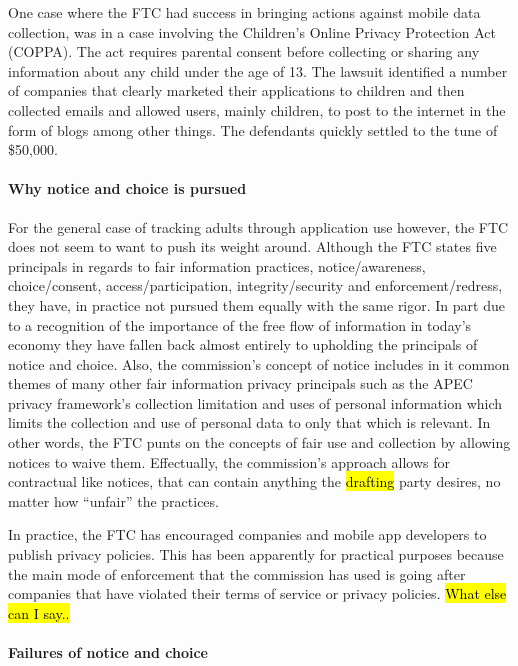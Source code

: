 One case where the FTC had success in bringing actions against mobile data collection, was in a case involving the Children's Online Privacy Protection Act (COPPA). The act requires parental consent before collecting or sharing any information about any child under the age of 13. The lawsuit identified a number of companies that clearly marketed their applications to children and then collected emails and allowed users, mainly children, to post to the internet in the form of blogs among other things\cite{ftc2011}. The defendants quickly settled to the tune of \$50,000. 


		\paragraph{Why notice and choice is pursued}

For the general case of tracking adults through application use however, the FTC does not seem to want to push its weight around. 
Although the FTC states five principals in regards to fair information practices, notice/awareness, choice/consent, access/participation, integrity/security and enforcement/redress, they have, in practice not pursued them equally with the same rigor.
In part due to a recognition of the importance of the free flow of information in today's economy\cite{56} they have fallen back almost entirely to upholding the principals of notice and choice. 
Also, the commission's concept of notice includes in it common themes of many other fair information privacy principals such as the APEC privacy framework's collection limitation and uses of personal information which limits the collection and use of personal data to only that which is relevant\cite{apec}. 
In other words, the FTC punts on the concepts of fair use and collection by allowing notices to waive them. 
Effectually, the commission's approach allows for contractual like notices, that can contain anything the \hl{drafting} party desires, no matter how ``unfair'' the practices\cite{fair}. 

In practice, the FTC has encouraged companies and mobile app developers to publish privacy policies. This has been apparently for practical purposes because the main mode of enforcement that the commission has used is going after companies that have violated their terms of service or privacy policies. 
\hl{What else can I say..}

		\paragraph{Failures of notice and choice}

